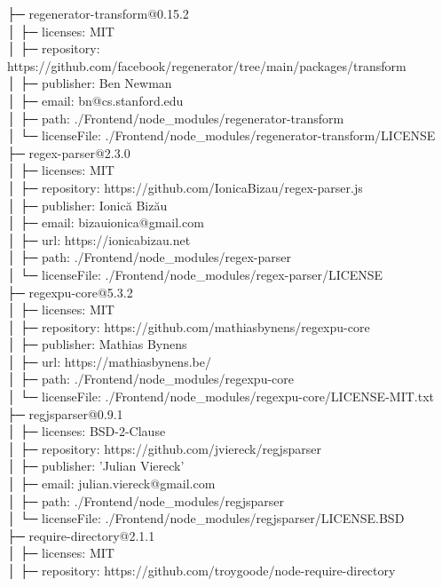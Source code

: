 ├─ regenerator-transform@0.15.2\\
│  ├─ licenses: MIT\\
│  ├─ repository: https://github.com/facebook/regenerator/tree/main/packages/transform\\
│  ├─ publisher: Ben Newman\\
│  ├─ email: bn@cs.stanford.edu\\
│  ├─ path: ./Frontend/node\_modules/regenerator-transform\\
│  └─ licenseFile: ./Frontend/node\_modules/regenerator-transform/LICENSE\\
├─ regex-parser@2.3.0\\
│  ├─ licenses: MIT\\
│  ├─ repository: https://github.com/IonicaBizau/regex-parser.js\\
│  ├─ publisher: Ionică Bizău\\
│  ├─ email: bizauionica@gmail.com\\
│  ├─ url: https://ionicabizau.net\\
│  ├─ path: ./Frontend/node\_modules/regex-parser\\
│  └─ licenseFile: ./Frontend/node\_modules/regex-parser/LICENSE\\
├─ regexpu-core@5.3.2\\
│  ├─ licenses: MIT\\
│  ├─ repository: https://github.com/mathiasbynens/regexpu-core\\
│  ├─ publisher: Mathias Bynens\\
│  ├─ url: https://mathiasbynens.be/\\
│  ├─ path: ./Frontend/node\_modules/regexpu-core\\
│  └─ licenseFile: ./Frontend/node\_modules/regexpu-core/LICENSE-MIT.txt\\
├─ regjsparser@0.9.1\\
│  ├─ licenses: BSD-2-Clause\\
│  ├─ repository: https://github.com/jviereck/regjsparser\\
│  ├─ publisher: 'Julian Viereck'\\
│  ├─ email: julian.viereck@gmail.com\\
│  ├─ path: ./Frontend/node\_modules/regjsparser\\
│  └─ licenseFile: ./Frontend/node\_modules/regjsparser/LICENSE.BSD\\
├─ require-directory@2.1.1\\
│  ├─ licenses: MIT\\
│  ├─ repository: https://github.com/troygoode/node-require-directory\\
